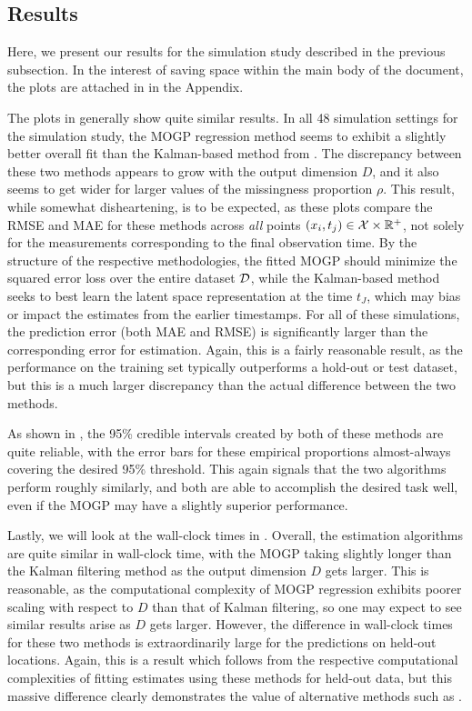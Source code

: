 \documentclass[10pt]{article}
\numberwithin{equation}{section}
\begin{document}
\subsection{Results}

Here, we present our results for the simulation study described in the previous subsection. In the interest of saving space within the main body of the document, the plots are attached in  in the Appendix.

The plots in  generally show quite similar results. In all 48 simulation settings for the simulation study, the MOGP regression method seems to exhibit a slightly better overall fit than the Kalman-based method from . The discrepancy between these two methods appears to grow with the output dimension $D$, and it also seems to get wider for larger values of the missingness proportion $\rho$. This result, while somewhat disheartening, is to be expected, as these plots compare the RMSE and MAE for these methods across \emph{all} points $(x_{i}, t_{j}) \in \mathcal{X} \times \mathbb{R}^{+}$, not solely for the measurements corresponding to the final observation time. By the structure of the respective methodologies, the fitted MOGP should minimize the squared error loss over the entire dataset $\mathcal{D}$, while the Kalman-based method seeks to best learn the latent space representation at the time $t_{J}$, which may bias or impact the estimates from the earlier timestamps. For all of these simulations, the prediction error (both MAE and RMSE) is significantly larger than the corresponding error for estimation. Again, this is a fairly reasonable result, as the performance on the training set typically outperforms a hold-out or test dataset, but this is a much larger discrepancy than the actual difference between the two methods.

As shown in , the 95\% credible intervals created by both of these methods are quite reliable, with the error bars for these empirical proportions almost-always covering the desired 95\% threshold. This again signals that the two algorithms perform roughly similarly, and both are able to accomplish the desired task well, even if the MOGP may have a slightly superior performance. 

Lastly, we will look at the wall-clock times in . Overall, the estimation algorithms are quite similar in wall-clock time, with the MOGP taking slightly longer than the Kalman filtering method as the output dimension $D$ gets larger. This is reasonable, as the computational complexity of MOGP regression exhibits poorer scaling with respect to $D$ than that of Kalman filtering, so one may expect to see similar results arise as $D$ gets larger. However, the difference in wall-clock times for these two methods is extraordinarily large for the predictions on held-out locations. Again, this is a result which follows from the respective computational complexities of fitting estimates using these methods for held-out data, but this massive difference clearly demonstrates the value of alternative methods such as .
\end{document}
